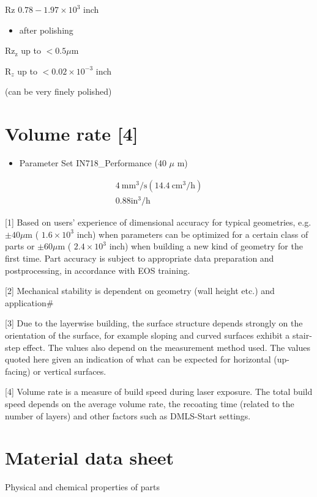 \documentclass[10pt]{article}
\begin{document}
Rz $0.78-1.97 \times 10^{3}$ inch

\begin{itemize}
  \item after polishing
\end{itemize}

$\mathrm{Rz}_{\mathrm{z}}$ up to $<0.5 \mu \mathrm{m}$

$\mathrm{R}_{z}$ up to $<0.02 \times 10^{-3}$ inch

(can be very finely polished)

\section*{Volume rate [4]}
\begin{itemize}
  \item Parameter Set IN718\_Performance (40 $\mu$ m)
\end{itemize}

$$
\begin{gathered}
4 \mathrm{~mm}^{3} / \mathrm{s}\left(14.4 \mathrm{~cm}^{3} / \mathrm{h}\right) \\
0.88 \mathrm{in}^{3} / \mathrm{h}
\end{gathered}
$$

[1] Based on users' experience of dimensional accuracy for typical geometries, e.g. $\pm 40 \mu \mathrm{m}$ ( $1.6 \times 10^{3}$ inch) when parameters can be optimized for a certain class of parts or $\pm 60 \mu \mathrm{m}$ ( $2.4 \times 10^{3}$ inch) when building a new kind of geometry for the first time. Part accuracy is subject to appropriate data preparation and postprocessing, in accordance with EOS training.

[2] Mechanical stability is dependent on geometry (wall height etc.) and application\#

[3] Due to the layerwise building, the surface structure depends strongly on the orientation of the surface, for example sloping and curved surfaces exhibit a stair-step effect. The values also depend on the measurement method used. The values quoted here given an indication of what can be expected for horizontal (up-facing) or vertical surfaces.

[4] Volume rate is a measure of build speed during laser exposure. The total build speed depends on the average volume rate, the recoating time (related to the number of layers) and other factors such as DMLS-Start settings.

\section*{Material data sheet}
Physical and chemical properties of parts
\end{document}
